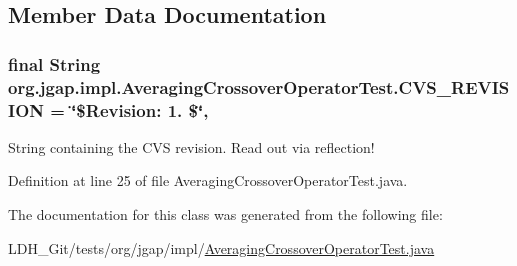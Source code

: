 \subsection{Member Data Documentation}
\hypertarget{classorg_1_1jgap_1_1impl_1_1_averaging_crossover_operator_test_a1b43c3cc2c1234476b994d0ea2b44ac5}{
\subsubsection[{C\-V\-S\-\_\-\-R\-E\-V\-I\-S\-I\-O\-N}]{\setlength{\rightskip}{0pt plus 5cm}final String org.\-jgap.\-impl.\-Averaging\-Crossover\-Operator\-Test.\-C\-V\-S\-\_\-\-R\-E\-V\-I\-S\-I\-O\-N = \char`\"{}\$Revision\-: 1. \$\char`\"{}\hspace{0.3cm}{\ttfamily [static]}, {\ttfamily [private]}}}\label{classorg_1_1jgap_1_1impl_1_1_averaging_crossover_operator_test_a1b43c3cc2c1234476b994d0ea2b44ac5}
String containing the C\-V\-S revision. Read out via reflection! 

Definition at line 25 of file Averaging\-Crossover\-Operator\-Test.\-java.



The documentation for this class was generated from the following file\-:\begin{DoxyCompactItemize}
\item 
L\-D\-H\-\_\-\-Git/tests/org/jgap/impl/\hyperlink{_averaging_crossover_operator_test_8java}{Averaging\-Crossover\-Operator\-Test.\-java}\end{DoxyCompactItemize}
